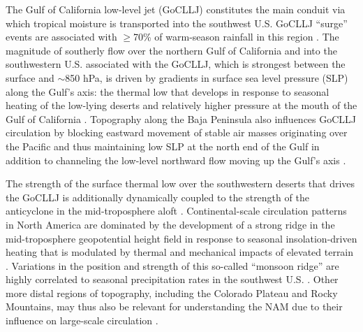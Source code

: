 \documentclass[draft]{agujournal2019}
\begin{document}
The Gulf of California low-level jet (GoCLLJ) constitutes the main conduit via which tropical moisture is transported into the southwest U.S. GoCLLJ ``surge'' events are associated with $\geq$70\% of warm-season rainfall in this region \cite{berbery01jc,berbery03jc,higgins04jc,bordoni06mwr,pascale16mwr,jana18jgra,duan24jgra}. The magnitude of southerly flow over the northern Gulf of California and into the southwestern U.S. associated with the GoCLLJ, which is strongest between the surface and $\sim$850 hPa, is driven by gradients in surface sea level pressure (SLP) along the Gulf's axis: the thermal low that develops in response to seasonal heating of the low-lying deserts and relatively higher pressure at the mouth of the Gulf of California \cite{stensrud97mwr,anderson01jgra,turrent09grl}. Topography along the Baja Peninsula also influences GoCLLJ circulation by blocking eastward movement of stable air masses originating over the Pacific and thus maintaining low SLP at the north end of the Gulf in addition to channeling the low-level northward flow moving up the Gulf's axis \cite{pascale16jc,johnson23jc}. %

The strength of the surface thermal low over the southwestern deserts that drives the GoCLLJ is additionally dynamically coupled to the strength of the anticyclone in the mid-troposphere aloft \cite{hoskins91tdmo,broccoli92jc,rowson92ijc,barlow98jc,rodwell01jc}. Continental-scale circulation patterns in North America are dominated by the development of a strong ridge in the mid-troposphere geopotential height field in response to seasonal insolation-driven heating that is modulated by thermal and mechanical impacts of elevated terrain \cite{broccoli92jc,barlow98jc,ringler99jas}. Variations in the position and strength of this so-called ``monsoon ridge'' are highly correlated to seasonal precipitation rates in the southwest U.S. \cite{grantz07jc,turrent12jc,seastrand15ijc}. Other more distal regions of topography, including the Colorado Plateau and Rocky Mountains, may thus also be relevant for understanding the NAM due to their influence on large-scale circulation \cite{tang84mwr,ringler99jas,qin23ijc,johnson25pdt}. 
\end{document}
